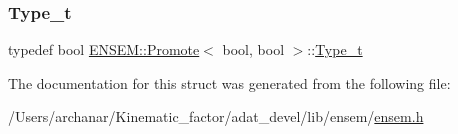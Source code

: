 \subsubsection{\texorpdfstring{Type\_t}{Type\_t}\hspace{0.1cm}{\footnotesize\ttfamily [2/2]}}
{\footnotesize\ttfamily typedef bool \mbox{\hyperlink{structENSEM_1_1Promote}{E\+N\+S\+E\+M\+::\+Promote}}$<$ bool, bool $>$\+::\mbox{\hyperlink{structENSEM_1_1Promote_3_01bool_00_01bool_01_4_a5838c93b09205ae2ab83138d0d4c02e4}{Type\+\_\+t}}}



The documentation for this struct was generated from the following file\+:\begin{DoxyCompactItemize}
\item 
/\+Users/archanar/\+Kinematic\+\_\+factor/adat\+\_\+devel/lib/ensem/\mbox{\hyperlink{lib_2ensem_2ensem_8h}{ensem.\+h}}\end{DoxyCompactItemize}
